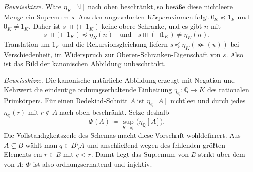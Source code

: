 \documentclass[main.tex]{subfiles}
\begin{document}
\emph{Beweisskizze.}
Wäre \(\eta_K[\mathbb N]\) nach oben beschränkt, so besäße diese
nichtleere Menge ein Supremum \(s\). Aus den angeordneten Körperaxiomen folgt
\(0_K\preccurlyeq1_K\) und \(0_K\neq1_K\). Daher ist
\(s\boxplus(\boxminus1_K)\) keine obere Schranke, und es gibt \(n\) mit
\[
  s\boxplus(\boxminus1_K)\preccurlyeq\eta_K(n)
  \quad\text{und}\quad
  s\boxplus(\boxminus1_K)\neq\eta_K(n).
\]
Translation um \(1_K\) und die Rekursionsgleichung liefern
\(s\preccurlyeq\eta_K(\Succ(n))\) bei Verschiedenheit, im Widerspruch zur
Oberen-Schranken-Eigenschaft von \(s\). Also ist das Bild der kanonischen
Abbildung unbeschränkt.


\emph{Beweisskizze.}
Die kanonische natürliche Abbildung erzeugt mit Negation und Kehrwert die
eindeutige ordnungserhaltende Einbettung
\(\eta_{\mathbb Q}\colon\mathbb Q\to K\) des rationalen Primkörpers. Für
einen Dedekind-Schnitt \(A\) ist \(\eta_{\mathbb Q}[A]\) nichtleer und durch
jedes \(\eta_{\mathbb Q}(r)\) mit \(r\notin A\) nach oben beschränkt. Setze
deshalb
\[
  \Phi(A)\coloneqq
  \sup_{K,\preccurlyeq}\bigl(\eta_{\mathbb Q}[A]\bigr).
\]
Die Vollständigkeitszeile des Schemas macht diese Vorschrift wohldefiniert.
Aus \(A\subsetneq B\) wählt man \(q\in B\setminus A\) und anschließend wegen
des fehlenden größten Elements ein \(r\in B\) mit \(q<r\). Damit liegt das
Supremum von \(B\) strikt über dem von \(A\); \(\Phi\) ist also
ordnungserhaltend und injektiv.
\end{document}
